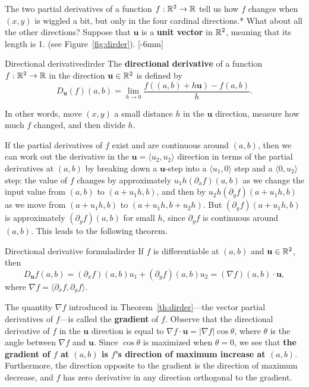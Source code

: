 \documentclass[svgnames]{report}
\begin{document}
  The two partial derivatives of a function $f: \mathbb{R}^2 \to \mathbb{R}$ tell us
  how $f$ changes when $(x,y)$ is wiggled a bit, but only in the four
  cardinal directions.* What about all the other directions? Suppose
  that $\mathbf{u}$ is a \textbf{unit vector} in $\mathbb{R}^2$, meaning that its
  length is 1. (see
  Figure~\ref{fig:dirder}). [-6mm]

  \begin{defn}{Directional derivative}{dirder}
    The \textbf{directional derivative} of a function $f:\mathbb{R}^2 \to \mathbb{R}$
    in the direction $\mathbf{u} \in \mathbb{R}^2$ is defined by
    \[
      D_{\mathbf{u}}(f)(a,b) = \lim_{h \to 0}\frac{f( (a,b) + h
        \mathbf{u}) - f(a,b)}{h}. 
    \]  
  \end{defn}

  In other words, move $(x,y)$ a small distance $h$ in the
  $\mathbf{u}$ direction, measure how much $f$ changed, and then
  divide $h$.

  If the partial derivatives of $f$ exist and are continuous around
  $(a,b)$, then we can work out the derivative in the
  $\mathbf{u} = \langle u_2, u_2 \rangle$ direction in terms of the
  partial derivatives at $(a,b)$ by breaking down a $\mathbf{u}$-step
  into a $\langle u_1, 0\rangle$ step and a $\langle 0, u_2\rangle$
  step: the value of $f$ changes by approximately
  $u_1h (\partial_xf)(a,b)$ as we change the input value from $(a,b)$
  to $(a+u_1h, b)$, and then by $u_2h (\partial_yf)(a+u_1h,b)$ as we
  move from $(a+u_1h, b)$ to $(a+u_1h, b + u_2 h)$. But
  $(\partial_yf)(a+u_1h,b)$ is approximately
  $(\partial_yf)(a,b)$ for small $h$, since $\partial_y f$ is
  continuous around $(a,b)$. This leads to the following theorem.

  \begin{theo}{Directional derivative formula}{dirder}
    If $f$ is differentiable at $(a,b)$ and $ \mathbf{u}  \in \mathbb{R}^2$, then
    \[
      D_{\mathbf{u}} f(a,b) = (\partial_xf)(a,b)u_1 +
      (\partial_yf)(a,b)u_2 =  (\nabla f)(a,b) \cdot \mathbf{u}, 
    \]
    where $\nabla f = \langle \partial_x f, \partial_y f \rangle$. 
  \end{theo}

  The quantity $\nabla f$ introduced in Theorem~\ref{th:dirder}---the
  vector partial derivatives of $f$---is called the \textbf{gradient}
  of $f$. Observe that the directional derivative of $f$ in the
  $\mathbf{u}$ direction is equal to
  $\nabla f \cdot \mathbf{u} = |\nabla f| \cos \theta$, where $\theta$
  is the angle between $\nabla f$ and $\mathbf{u}$. Since $\cos\theta$
  is maximized when $\theta = 0$, we see that \textbf{the gradient of
    $f$ at $(a,b)$ is $f$'s direction of maximum increase at
    $(a,b)$}. Furthermore, the direction opposite to the gradient is
  the direction of maximum decrease, and $f$ has zero derivative in
  any direction orthogonal to the gradient.
\end{document}

